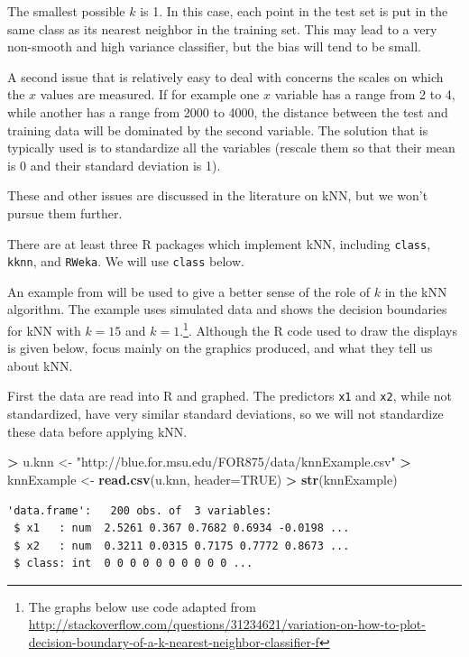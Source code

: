 \documentclass[]{krantz}
\makeatletter
\newenvironment{Shaded}{\begin{snugshade}}{\end{snugshade}}
\newcommand{\KeywordTok}[1]{\textcolor[rgb]{0.27,0.27,0.27}{\textbf{#1}}}
\newcommand{\DataTypeTok}[1]{\textcolor[rgb]{0.27,0.27,0.27}{#1}}
\newcommand{\StringTok}[1]{\textcolor[rgb]{0.5,0.5,0.5}{#1}}
\newcommand{\OtherTok}[1]{\textcolor[rgb]{0.37,0.37,0.37}{#1}}
\newcommand{\OperatorTok}[1]{\textcolor[rgb]{0.43,0.43,0.43}{\textbf{#1}}}
\newcommand{\NormalTok}[1]{#1}
\newenvironment{kframe}{%
\medskip{}
\setlength{\fboxsep}{.8em}
 \def\at@end@of@kframe{}%
 \ifinner\ifhmode%
  \def\at@end@of@kframe{\end{minipage}}%
  \begin{minipage}{\columnwidth}%
 \fi\fi%
 \def\FrameCommand##1{\hskip\@totalleftmargin \hskip-\fboxsep
 \colorbox{shadecolor}{##1}\hskip-\fboxsep
     \hskip-\linewidth \hskip-\@totalleftmargin \hskip\columnwidth}%
 \MakeFramed {\advance\hsize-\width
   \@totalleftmargin\z@ \linewidth\hsize
   \@setminipage}}%
 {\par\unskip\endMakeFramed%
 \at@end@of@kframe}
\renewenvironment{Shaded}{\begin{kframe}}{\end{kframe}}
\makeatother
\begin{document}
The smallest possible \(k\) is 1. In this case, each point in the test
set is put in the same class as its nearest neighbor in the training
set. This may lead to a very non-smooth and high variance classifier,
but the bias will tend to be small.

A second issue that is relatively easy to deal with concerns the scales
on which the \(x\) values are measured. If for example one \(x\)
variable has a range from 2 to 4, while another has a range from 2000 to
4000, the distance between the test and training data will be dominated
by the second variable. The solution that is typically used is to
standardize all the variables (rescale them so that their mean is 0 and
their standard deviation is 1).

These and other issues are discussed in the literature on kNN, but we
won't pursue them further.

There are at least three R packages which implement kNN, including
\texttt{class}, \texttt{kknn}, and \texttt{RWeka}. We will use
\texttt{class} below.

An example from \citet{hastieESL} will be used to give a better sense of
the role of \(k\) in the kNN algorithm. The example uses simulated data
and shows the decision boundaries for kNN with \(k=15\) and
\(k=1\).\footnote{The graphs below use code adapted from
  \url{http://stackoverflow.com/questions/31234621/variation-on-how-to-plot-decision-boundary-of-a-k-nearest-neighbor-classifier-f}}.
Although the R code used to draw the displays is given below, focus
mainly on the graphics produced, and what they tell us about kNN.

First the data are read into R and graphed. The predictors \texttt{x1}
and \texttt{x2}, while not standardized, have very similar standard
deviations, so we will not standardize these data before applying kNN.

\begin{Shaded}
\begin{Highlighting}[]
\OperatorTok{>}\StringTok{ }\NormalTok{u.knn <-}\StringTok{ "http://blue.for.msu.edu/FOR875/data/knnExample.csv"}
\OperatorTok{>}\StringTok{ }\NormalTok{knnExample <-}\StringTok{ }\KeywordTok{read.csv}\NormalTok{(u.knn, }\DataTypeTok{header=}\OtherTok{TRUE}\NormalTok{)}
\OperatorTok{>}\StringTok{ }\KeywordTok{str}\NormalTok{(knnExample)}
\end{Highlighting}
\end{Shaded}

\begin{verbatim}
'data.frame':   200 obs. of  3 variables:
 $ x1   : num  2.5261 0.367 0.7682 0.6934 -0.0198 ...
 $ x2   : num  0.3211 0.0315 0.7175 0.7772 0.8673 ...
 $ class: int  0 0 0 0 0 0 0 0 0 0 ...
\end{verbatim}
\end{document}
